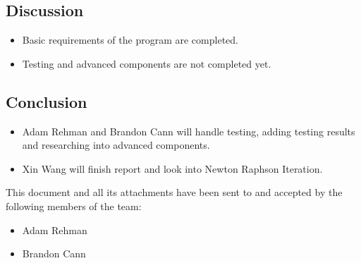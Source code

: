 \documentclass[a4paper]{article}
\begin{document}
\subsection{Discussion}
\begin{itemize}
    \item Basic requirements of the program are completed. 
    \item Testing and advanced components are not completed yet.
\end{itemize}
\subsection{Conclusion}
\begin{itemize}
    \item Adam Rehman and Brandon Cann will handle testing, adding testing results and 
    researching into advanced components. 
    \item Xin Wang will finish report and look into Newton Raphson Iteration.
\end{itemize}


\vspace*{\fill}
\begin{center}
This document and all its attachments have been sent to and accepted by the following members of the team:
\begin{itemize}
\item Adam Rehman
\item Brandon Cann
\end{itemize}
\end{center}
\end{document}
